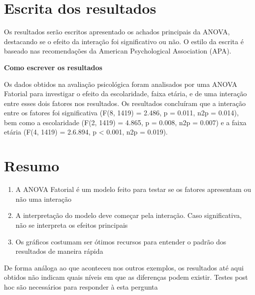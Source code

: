 \documentclass[
]{book}
\providecommand{\tightlist}{%
  \setlength{\itemsep}{0pt}\setlength{\parskip}{0pt}}
\begin{document}
\hypertarget{escrita-dos-resultados-7}{%
\section{Escrita dos resultados}\label{escrita-dos-resultados-7}}

Os resultados serão escritos apresentado os achados principais da ANOVA,
destacando se o efeito da interação foi significativo ou não. O estilo
da escrita é baseado nas recomendações da American Psychological
Association (APA).

\begin{writing}
\textbf{Como escrever os resultados}

Os dados obtidos na avaliação psicológica foram analisados por uma ANOVA
Fatorial para investigar o efeito da escolaridade, faixa etária, e de
uma interação entre esses dois fatores nos resultados. Os resultados
concluíram que a interação entre os fatores foi significativa (F(8,
1419) = 2.486, p = 0.011, n2p = 0.014), bem como a escolaridade (F(2,
1419) = 4.865, p = 0.008, n2p = 0.007) e a faixa etária (F(4, 1419) =
2.6.894, p \textless{} 0.001, n2p = 0.019).
\end{writing}

\hypertarget{resumo-8}{%
\section{Resumo}\label{resumo-8}}

\begin{explore}

\begin{enumerate}
\def\labelenumi{\arabic{enumi}.}
\tightlist
\item
  A ANOVA Fatorial é um modelo feito para testar se os fatores
  apresentam ou não uma interação\\
\item
  A interpretação do modelo deve começar pela interação. Caso
  significativa, não se interpreta os efeitos principais\\
\item
  Os gráficos costumam ser ótimos recursos para entender o padrão dos
  resultados de maneira rápida\\
\end{enumerate}

\end{explore}

De forma análoga ao que aconteceu nos outros exemplos, os resultados até
aqui obtidos não indicam quais níveis em que as diferenças podem
existir. Testes post hoc são necessários para responder à esta pergunta
\end{document}
